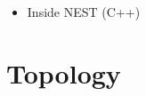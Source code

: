 \documentclass[
	t, %
	10pt, %
	aspectratio=1610, %
	ngerman,
	english,
	]{beamer}
\begin{document}
\begin{frame}
{{{{\begin{itemize}
\begin{itemize}
            \end{itemize}
          \item Inside NEST (C++)
          \end{itemize}
        }}}
  }
\end{frame}


\def\ttl{Topology}
\section{\ttl}
\end{document}
